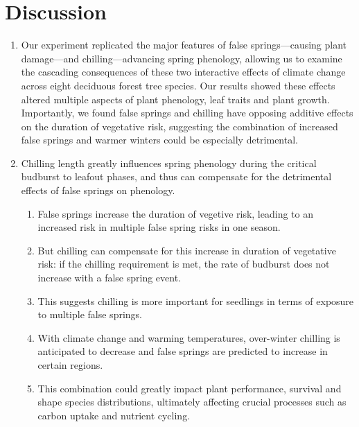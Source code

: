 \documentclass{article}\usepackage[]{graphicx}\usepackage[]{color}
\begin{document}
\section*{Discussion}
\begin{enumerate}
\item Our experiment replicated the major features of false springs---causing plant damage---and chilling---advancing spring phenology, allowing us to examine the cascading consequences of these two interactive effects of climate change across eight deciduous forest tree species. Our results showed these effects altered multiple aspects of plant phenology, leaf traits and plant growth. Importantly, we found false springs and chilling have opposing additive effects on the duration of vegetative risk, suggesting the combination of increased false springs and warmer winters could be especially detrimental.

\item Chilling length greatly influences spring phenology during the critical budburst to leafout phases, and thus can compensate for the detrimental effects of false springs on phenology.
  \begin{enumerate}
  \item False springs increase the duration of vegetive risk, leading to an increased risk in multiple false spring risks in one season.
  \item But chilling can compensate for this increase in duration of vegetative risk: if the chilling requirement is met, the rate of budburst does not increase with a false spring event. %
  \item This suggests chilling is more important for seedlings in terms of exposure to multiple false springs.
  \item With climate change and warming temperatures, over-winter chilling is anticipated to decrease and false springs are predicted to increase in certain regions.
  \item This combination could greatly impact plant performance, survival and shape species distributions, ultimately affecting crucial processes such as carbon uptake and nutrient cycling.
  \end{enumerate}
  

\end{enumerate}
\end{document}
